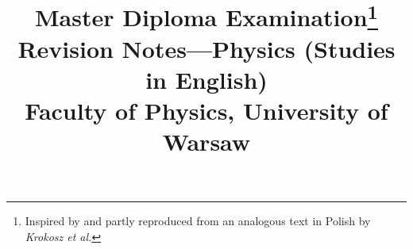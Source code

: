 \usepackage[dvipsnames]{xcolor}   %

\usepackage{hyperref}             %
\hypersetup{
	linkcolor  = linkcolor,
	citecolor  = linkcolor,
	urlcolor   = linkcolor,
	colorlinks = true,
	breaklinks = true
}
\usepackage[capitalize,nameinlink]{cleveref}  %

\title{%
	\vspace*{2cm}
	{\Huge Master Diploma Examination}\thanks{Inspired by and partly reproduced from an analogous text in Polish by \textit{Krokosz et al.}}\\[1cm]
	{\Large Revision Notes---Physics (Studies in English)}\\[0.4cm]
	{\large Faculty of Physics, University of Warsaw}\\
}

\usepackage[disable]{todonotes}                            %
\newcommand{\todoper}[1]{\todo[backgroundcolor=red!25,linecolor=red!55]{#1}}       %
\newcommand{\todoai}[1]{\todo[backgroundcolor=green!25,linecolor=green!55]{#1}}    %
\newcommand{\merr}{\textcolor{red}{\textbf{(!)}}} %
\newcommand{\todoans}[1]{\todo[backgroundcolor=blue!25,linecolor=blue!55]{#1}}  %

\usepackage{fancyhdr}   %
\pagestyle{fancy}
\fancyhf{} %
\renewcommand{\headrulewidth}{0pt} %
\fancyfoot[C]{\thepage}	%

